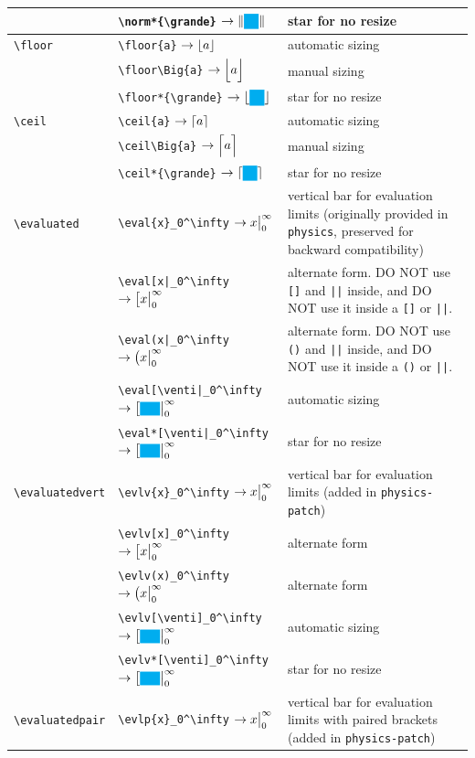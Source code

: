 \documentclass[a4paper,12pt]{article}
\begin{document}
\begin{longtable}[c]{|L{0.2\textwidth}|L{0.35\textwidth}|L{0.35\textwidth}|}
& \verb|\norm*{\grande}| $\rightarrow \norm*{\grande}$ & star for no resize \\\hline
\verb|\floor| & \verb|\floor{a}| $\rightarrow \floor{a}$ & automatic sizing \\
& \verb|\floor\Big{a}| $\rightarrow \floor\Big{a}$ & manual sizing \\
& \verb|\floor*{\grande}| $\rightarrow \floor*{\grande}$ & star for no resize \\\hline
\verb|\ceil| & \verb|\ceil{a}| $\rightarrow \ceil{a}$ & automatic sizing \\
& \verb|\ceil\Big{a}| $\rightarrow \ceil\Big{a}$ & manual sizing \\
& \verb|\ceil*{\grande}| $\rightarrow \ceil*{\grande}$ & star for no resize \\\hline
\verb|\evaluated| & \verb|\eval{x}_0^\infty| $\rightarrow \eval{x}_0^\infty$ & vertical bar for evaluation limits (originally provided in \verb|physics|, preserved for backward compatibility) \\
& \verb+\eval[x|_0^\infty+ $\rightarrow \eval[x|_0^\infty$ & alternate form. DO NOT use \verb+[]+ and \verb+||+ inside, and DO NOT use it inside a \verb+[]+ or \verb+||+. \\
& \verb+\eval(x|_0^\infty+ $\rightarrow \eval(x|_0^\infty$ & alternate form. DO NOT use \verb+()+ and \verb+||+ inside, and DO NOT use it inside a \verb+()+ or \verb+||+. \\ 
& \verb+\eval[\venti|_0^\infty+ $\rightarrow \eval[\venti|_0^\infty$ & automatic sizing\\
& \verb+\eval*[\venti|_0^\infty+ $\rightarrow \eval*[\venti|_0^\infty$ & star for no resize \\\hline
\verb|\evaluatedvert| & \verb|\evlv{x}_0^\infty| $\rightarrow \eval{x}_0^\infty$ & vertical bar for evaluation limits (added in \verb|physics-patch|) \\
& \verb+\evlv[x]_0^\infty+ $\rightarrow \evlv[x]_0^\infty$ & alternate form \\
& \verb+\evlv(x)_0^\infty+ $\rightarrow \evlv(x)_0^\infty$ & alternate form \\
& \verb+\evlv[\venti]_0^\infty+ $\rightarrow \evlv[\venti]_0^\infty$ & automatic sizing\\
& \verb+\evlv*[\venti]_0^\infty+ $\rightarrow \evlv*[\venti]_0^\infty$ & star for no resize \\\hline
\verb|\evaluatedpair| & \verb|\evlp{x}_0^\infty| $\rightarrow \eval{x}_0^\infty$ & vertical bar for evaluation limits with paired brackets (added in \verb|physics-patch|) \\

\end{longtable}
\end{document}
